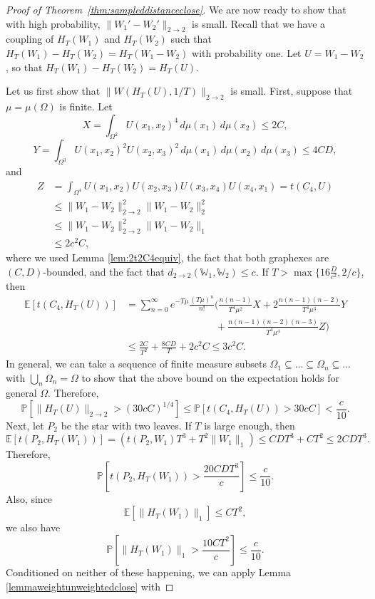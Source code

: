 \documentclass{amsart}
\numberwithin{equation}{section}
\numberwithin{figure}{section}
\theoremstyle{definition}
\theoremstyle{remark}
\newcommand{\EE}{\mathbb{E}}
\newcommand{\PP}{\mathbb{P}}
\newcommand{\cW}{\mathbb{W}}
\def\d22{d_{2\to 2}}
\begin{document}
\begin{proof}[Proof of Theorem~\ref{thm:sampleddistanceclose}]
We are now ready to show that with high probability, $\|W_1'-W_2'\|_{2
\rightarrow 2}$ is small. Recall that we have a coupling of $H_T(W_1)$ and
$H_T(W_2)$ such that $H_T(W_1)-H_T(W_2)=H_T(W_1-W_2)$ with probability one.
Let $U=W_1-W_2$, so that $H_T(W_1)-H_T(W_2)=H_T(U)$.

Let us first show that $\|W(H_T(U),1/T)\|_{2 \rightarrow 2}$ is small. First,
suppose that $\mu=\mu(\Omega)$ is finite. Let
\[X=\int_{\Omega^2} U(x_1,x_2)^4 \,d\mu(x_1) \,d\mu(x_2) \le 2C,\]
\[Y= \int_{\Omega^3}U(x_1,x_2)^2U(x_2,x_3)^2\,d\mu(x_1)\,d\mu(x_2)\,d\mu(x_3) \le 4CD,\]
and
\begin{align*}
Z&=\int_{\Omega^4}U(x_1,x_2)U(x_2,x_3)U(x_3,x_4)U(x_4,x_1)=t(C_4,U)
\\
&\le \|W_1-W_2\|_{2 \rightarrow 2}^2 \|W_1-W_2\|_{2}^2\\
& \le \|W_1-W_2\|_{2
\rightarrow 2}^2 \|W_1-W_2\|_1\\
&\le 2c^2 C, \end{align*} where we used Lemma \ref{lem:2t2C4equiv}, the fact
that both graphexes are $(C,D)$-bounded, and the fact that
$\d22(\cW_1,\cW_2)\leq c$. If $T>\max\{16\frac{D}{c^2},2/c\}$, then
\begin{align*}
\EE[t(C_4,H_T(U))]&=
\sum_{n=0}^{\infty} e^{-T\mu} \frac{(T\mu)^n}{n!} \bigg(\frac{n (n-1)}{T^4\mu^2} X+2\frac{n(n-1)(n-2)}{T^4\mu^3}Y\\
& \qquad \qquad \qquad \qquad \quad \phantom{} +\frac{n(n-1)(n-2)(n-3)}{T^4\mu^4}Z\bigg)\\
&\le \frac{2C}{T^2}
+\frac{8CD}{T}
+2c^2C
\le 3c^2C.
\end{align*}
In general, we can take a sequence of finite measure subsets $\Omega_1
\subseteq \dots \subseteq \Omega_n \subseteq \dots$ with $\bigcup_n
\Omega_n=\Omega$ to show that the above bound on the expectation holds for
general $\Omega$. Therefore,
\[\PP[\|H_T(U)\|_{2 \rightarrow 2}> (30cC)^{1/4} ] \le\PP[t(C_4,H_T(U))>30 c C]<\frac{c}{10}
.\] Next, let $P_2$ be the star with two leaves. If $T$ is large enough, then
\[\EE[t(P_2,H_T(W_1))]= \left(t(P_2,W_1)T^3+ T^2 \|W_1\|_1\right) \le CDT^3 + CT^2 \le 2CDT^3
.\] Therefore,
\[\PP\left[t(P_2,H_T(W_1))>\frac{20CDT^3}{c}\right] \le \frac{c}{10}
.\]
Also, since
\[\EE[\|H_T(W_1)\|_1] \le CT^2
,\]
we also have
\[\PP\left[\|H_T(W_1)\|_1>\frac{10CT^2}{c}\right] \le \frac{c}{10}
.\]
Conditioned on neither of these happening, we can apply Lemma \ref{lemmaweightunweightedclose} with

\end{proof}
\end{document}
